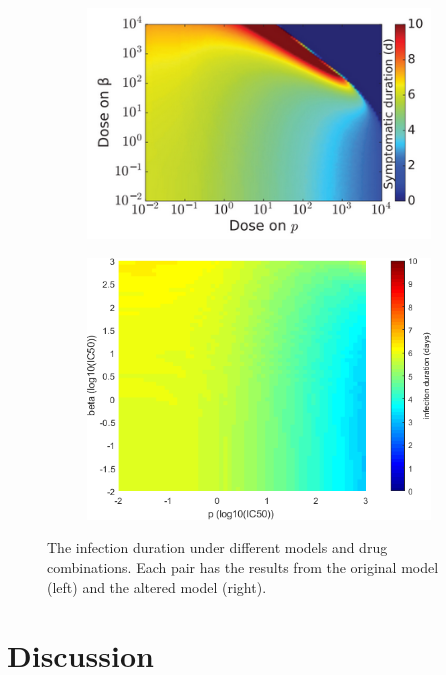 \documentclass[a4paper,11pt]{article}
\begin{document}
\begin{figure}[H]
\begin{subfigure}{0.4\textwidth}
    \includegraphics[width=\textwidth]{MBetaPT.png}
    \end{subfigure}
    \begin{subfigure}{0.35\textwidth}
    
    \includegraphics[width=\textwidth]{BetaP_times.png}
    \end{subfigure}
    
     \caption{\small The infection duration under different models and drug combinations. Each pair has the results from the original model (left) and the altered model (right).}
    \label{fig:my_label}
    
    \end{figure}
  

\newpage

\section*{Discussion}
\end{document}
